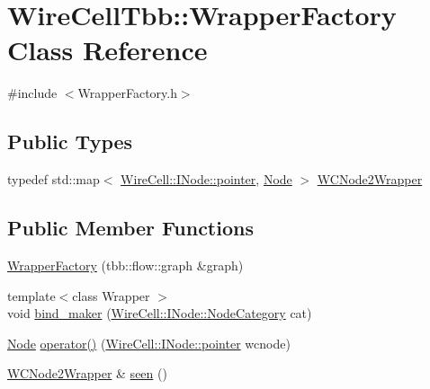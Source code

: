\hypertarget{class_wire_cell_tbb_1_1_wrapper_factory}{}\section{Wire\+Cell\+Tbb\+:\+:Wrapper\+Factory Class Reference}
\label{class_wire_cell_tbb_1_1_wrapper_factory}


{\ttfamily \#include $<$Wrapper\+Factory.\+h$>$}

\subsection*{Public Types}
\begin{DoxyCompactItemize}
\item 
typedef std\+::map$<$ \hyperlink{class_wire_cell_1_1_interface_a09c548fb8266cfa39afb2e74a4615c37}{Wire\+Cell\+::\+I\+Node\+::pointer}, \hyperlink{namespace_wire_cell_tbb_aa7b6ff37a20e0174babf0614286bb59f}{Node} $>$ \hyperlink{class_wire_cell_tbb_1_1_wrapper_factory_abb90529b755ae886470769d8c46dc041}{W\+C\+Node2\+Wrapper}
\end{DoxyCompactItemize}
\subsection*{Public Member Functions}
\begin{DoxyCompactItemize}
\item 
\hyperlink{class_wire_cell_tbb_1_1_wrapper_factory_a01283bcacef807e6fc326a7ec6c85b56}{Wrapper\+Factory} (tbb\+::flow\+::graph \&graph)
\item 
{\footnotesize template$<$class Wrapper $>$ }\\void \hyperlink{class_wire_cell_tbb_1_1_wrapper_factory_a2493bed08f1ad70514da1bdcc2a41e02}{bind\+\_\+maker} (\hyperlink{class_wire_cell_1_1_i_node_a5546e64cbb70bd3ac787295cac9ac803}{Wire\+Cell\+::\+I\+Node\+::\+Node\+Category} cat)
\item 
\hyperlink{namespace_wire_cell_tbb_aa7b6ff37a20e0174babf0614286bb59f}{Node} \hyperlink{class_wire_cell_tbb_1_1_wrapper_factory_a97d887294839859ca613d604eaa39cfe}{operator()} (\hyperlink{class_wire_cell_1_1_interface_a09c548fb8266cfa39afb2e74a4615c37}{Wire\+Cell\+::\+I\+Node\+::pointer} wcnode)
\item 
\hyperlink{class_wire_cell_tbb_1_1_wrapper_factory_abb90529b755ae886470769d8c46dc041}{W\+C\+Node2\+Wrapper} \& \hyperlink{class_wire_cell_tbb_1_1_wrapper_factory_a66d71776bf06829f1e2a76a5f386935c}{seen} ()
\end{DoxyCompactItemize}


